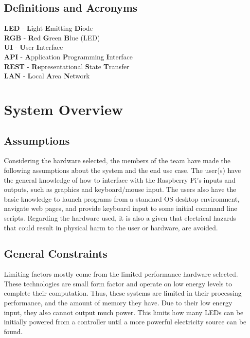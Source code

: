 		\subsection{Definitions and Acronyms}
		\textbf{LED} - \textbf{L}ight \textbf{E}mitting \textbf{D}iode
		\\\textbf{RGB} - \textbf{R}ed \textbf{G}reen \textbf{B}lue (LED)
		\\\textbf{UI} - \textbf{U}ser \textbf{I}nterface
		\\\textbf{API} - \textbf{A}pplication \textbf{P}rogramming \textbf{I}nterface
		\\\textbf{REST} - \textbf{Re}presentational \textbf{S}tate \textbf{T}ransfer
		\\\textbf{LAN} - \textbf{L}ocal \textbf{A}rea \textbf{N}etwork




	\section{System Overview}
		\subsection{Assumptions}
		Considering the hardware selected, the members of the team have made the following assumptions about the system and the end use case. The user(s) have
		the general knowledge of how to interface with the Raspberry Pi's inputs and outputs, such as graphics and keyboard/mouse input. The users also have the
		basic knowledge to launch programs from a standard OS desktop environment, navigate web pages, and provide keyboard input to some initial command line scripts.
		Regarding the hardware used, it is also a given that electrical hazards that could result in physical harm to the user or hardware, are avoided.

		\subsection{General Constraints}
		Limiting factors mostly come from the limited performance hardware selected. These technologies are small form factor and operate on low energy levels
		to complete their computation. Thus, these systems are limited in their processing performance, and the amount of memory they have. Due to their
		low energy input, they also cannot output much power. This limits how many LEDs can be initially powered from a controller until a more powerful
		electricity source can be found.

